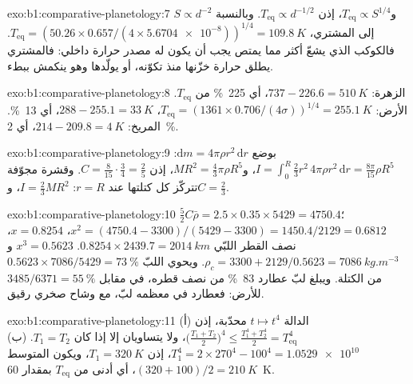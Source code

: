 \begin{solution}{exo:b1:comparative-planetology:7}
$S \propto d^{-2}$ و$T_\mathrm{eq} \propto S^{1/4}$، إذن $T_\mathrm{eq}
\propto d^{-1/2}$. وبالنسبة إلى المشتري، $T_\mathrm{eq} = (50.26\times0.657/(4\times
\num{5.6704e-8}))^{1/4} = \qty{109.8}{K}$. فالكوكب الذي يشعّ أكثر مما يمتص يجب أن يكون له مصدر حرارة داخلي: فالمشتري يطلق حرارة خزّنها منذ تكوّنه، أو يولّدها وهو ينكمش ببطء.
\end{solution}

\begin{solution}{exo:b1:comparative-planetology:8}
الزهرة: $737 - 226.6 = \qty{510}{K}$، أي \qty{225}{\percent} من $T_\mathrm{eq}$.
الأرض: $T_\mathrm{eq} = (1361\times0.706/(4\sigma))^{1/4} = \qty{255.1}{K}$،
$288 - 255.1 = \qty{33}{K}$، أي \qty{13}{\percent}. المريخ: $214 - 209.8 =
\qty{4}{K}$، أي \qty{2}{\percent}.
\end{solution}

\begin{solution}{exo:b1:comparative-planetology:9}
بوضع $\mathrm dm = 4\pi\rho r^2\,\mathrm dr$: $I = \int_0^R\tfrac23r^2\,4\pi
\rho r^2\,\mathrm dr = \tfrac{8\pi}{15}\rho R^5$، و$MR^2 = \tfrac43\pi\rho
R^5$، إذن $C = \tfrac{8}{15}\cdot\tfrac34 = \tfrac25$. وقشرة مجوّفة تتركّز كل كتلتها عند $r = R$: $I = \tfrac23MR^2$، و$C = \tfrac23$.
\end{solution}

\begin{solution}{exo:b1:comparative-planetology:10}
$\tfrac52C\bar\rho = 2.5\times0.35\times5429 = 4750.4$؛
$x^2 = (4750.4 - 3300)/(5429 - 3300) = 1450.4/2129 = 0.6812$، $x = 0.8254$،
نصف القطر اللبّي $0.8254\times2439.7 = \qty{2014}{km}$. $x^3 = 0.5623$ و
$\rho_c = 3300 + 2129/0.5623 = \qty{7086}{kg.m^{-3}}$. ويحوي اللبّ
$0.5623\times7086/5429 = \qty{73}{\percent}$ من الكتلة. ويبلغ لبّ عطارد \qty{83}{\percent} من نصف قطره، في مقابل $3485/6371 =
\qty{55}{\percent}$ للأرض: فعطارد في معظمه لبّ، مع وشاح صخري رقيق.
\end{solution}

\begin{solution}{exo:b1:comparative-planetology:11}
(أ) الدالة $t\mapsto t^4$ محدّبة، إذن
$\bigl(\tfrac{T_1 + T_2}{2}\bigr)^4 \le \tfrac{T_1^4 + T_2^4}{2} =
T_\mathrm{eq}^4$، ولا يتساويان إلا إذا كان $T_1 = T_2$. (ب) $T_1^4 =
2\times270^4 - 100^4 = \num{1.0529e10}$، إذن $T_1 = \qty{320}{K}$، ويكون المتوسط
$(320 + 100)/2 = \qty{210}{K}$، أي أدنى من $T_\mathrm{eq}$ بمقدار \qty{60}{K}.
\end{solution}

